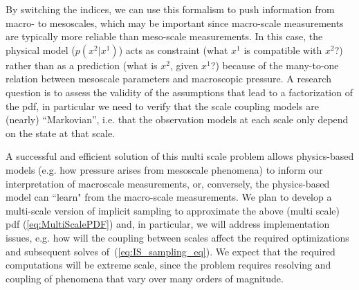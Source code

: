 \documentclass[11pt]{article}
\begin{document}
By switching the indices, we can use this formalism to push information from macro- to mesoscales, which may be important since macro-scale measurements are typically more reliable than meso-scale measurements. In this case, the physical model ($p(x^2|x^1)$) acts as constraint
(what $x^1$ is compatible with $x^2$?) rather than as a prediction (what is $x^2$, given $x^1$?) because
of the many-to-one relation between mesoscale parameters and macroscopic pressure.
A research question is to assess the validity of the assumptions that lead to a factorization of the pdf,
in particular we need to verify that the scale coupling models are (nearly) ``Markovian'', i.e.
that the observation models at each scale only depend on the state at that scale. 

A successful and efficient solution of this multi scale problem allows physics-based models (e.g. how pressure arises from mesoscale phenomena) to inform our interpretation of macroscale measurements, or, conversely, the physics-based model can ``learn" from the macro-scale measurements.
We plan to develop a multi-scale version of implicit sampling to approximate the above (multi scale) pdf (\ref{eq:MultiScalePDF}) and, in particular, we will address implementation issues, e.g. how will the coupling between scales affect the required optimizations and subsequent solves of~(\ref{eq:IS_sampling_eq}).
We expect that the required computations will be extreme scale, since the problem requires resolving and coupling of phenomena that vary over many orders of magnitude.
\end{document}
